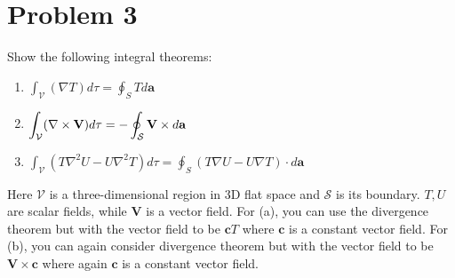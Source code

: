 \documentclass[10pt]{article}
\begin{document}
    \section*{Problem 3}
    Show the following integral theorems: 
    \begin{enumerate}[label=(\alph*)]
        \item $\displaystyle \int_{\mathcal V} (\nabla T) d\tau =\displaystyle \oint_S T d \mathbf a$
        \item $\displaystyle \int_{\mathcal V} (\nabla \times \mathbf V) d\tau = -\displaystyle \oint_{\mathcal S} \mathbf V \times d\mathbf a$
        \item $\displaystyle \int_{\mathcal V} (T \nabla^2 U - U \nabla^2 T) d\tau = \displaystyle \oint_S (T \nabla U - U \nabla T) \cdot d\mathbf a$
    \end{enumerate}
    Here $\mathcal V$ is a three-dimensional region in 3D flat space and $\mathcal S$ is its boundary. $T, U$ are scalar fields, while $\mathbf V$ is a vector field. For (a), you can use the divergence theorem but with the vector field to be $\mathbf cT$ where $\mathbf c$ is a constant vector field. For (b), you can again consider divergence theorem but with the vector field to be $\mathbf {V \times c}$ where again $\mathbf c$ is a constant vector field.
\end{document}
